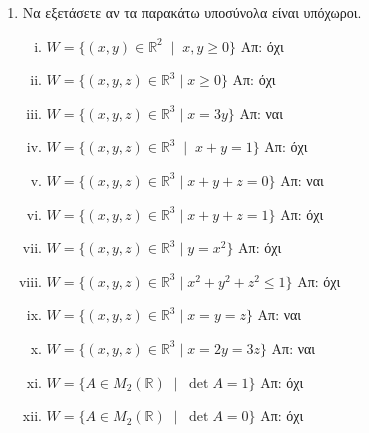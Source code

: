 


\usepackage{anyfontsize}
\pagestyle{vangelis}


\begin{center}
\end{center}

\vspace{\baselineskip}

\begin{enumerate}

    \item Να εξετάσετε αν τα παρακάτω υποσύνολα είναι υπόχωροι. 
        \begin{enumerate}[(i)]
            \item $ W = \{(x,y)\in \mathbb{R}^{2} \; \mid \; x,y \geq 0 \} $ 
                \hfill Απ: όχι 
            \item $ W = \{ (x,y,z) \in \mathbb{R}^{3} \mid x\geq 0 \} $ \hfill Απ:  όχι
            \item $ W = \{ (x,y,z) \in \mathbb{R}^{3} \mid x = 3y \} $ \hfill Απ: ναι
            \item $ W = \{ (x,y,z) \in \mathbb{R}^{3} \; \mid \; x+y=1 \} $ 
                \hfill Απ: όχι 
            \item $ W = \{ (x,y,z) \in \mathbb{R}^{3} \mid x + y + z = 0 \} $ 
                \hfill Απ: ναι
            \item $ W = \{ (x,y,z) \in \mathbb{R}^{3} \mid x + y + z = 1 \} $ 
                \hfill Απ: όχι
            \item $ W = \{ (x,y,z) \in \mathbb{R}^{3} \mid y = x^{2} \} $ 
                \hfill Απ: όχι 
            \item $ W = \{ (x,y,z) \in \mathbb{R}^{3} \mid x^{2} + y^{2} + z^{2} 
                \leq 1  \} $ \hfill Απ: όχι
            \item $ W = \{ (x,y,z) \in \mathbb{R}^{3} \mid x = y = z \} $ \hfill Απ: ναι
            \item $ W = \{ (x,y,z) \in \mathbb{R}^{3} \mid x = 2y = 3z \} $ 
                \hfill Απ: ναι 
            \item $ W = \{ A \in M_{2}(\mathbb{R}) \; \mid \; \det{A}=1 \} $ 
                \hfill Απ: όχι 
            \item $ W = \{ A \in M_{2}(\mathbb{R}) \; \mid \; \det{A}=0 \} $ 
                \hfill Απ: όχι 
        \end{enumerate}


\end{enumerate}

